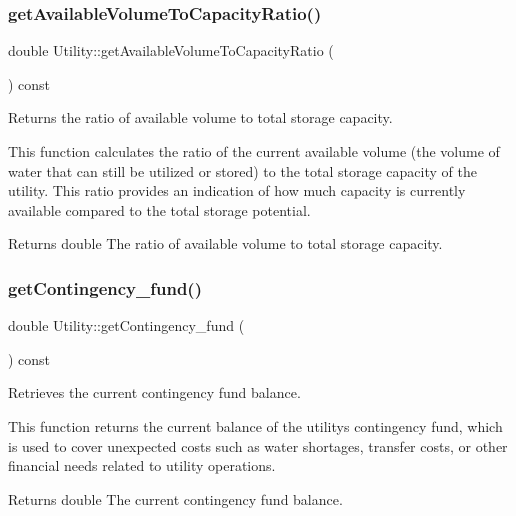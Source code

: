 \subsubsection{\texorpdfstring{get\+Available\+Volume\+To\+Capacity\+Ratio()}{getAvailableVolumeToCapacityRatio()}}
{\footnotesize\ttfamily double Utility\+::get\+Available\+Volume\+To\+Capacity\+Ratio (\begin{DoxyParamCaption}{ }\end{DoxyParamCaption}) const}



Returns the ratio of available volume to total storage capacity. 

This function calculates the ratio of the current available volume (the volume of water that can still be utilized or stored) to the total storage capacity of the utility. This ratio provides an indication of how much capacity is currently available compared to the total storage potential.

\begin{DoxyReturn}{Returns}
double The ratio of available volume to total storage capacity. 
\end{DoxyReturn}
\mbox{\label{classUtility_ab396bc312d5e5ddc0554138060a8a4d3}} 
\subsubsection{\texorpdfstring{get\+Contingency\+\_\+fund()}{getContingency\_fund()}}
{\footnotesize\ttfamily double Utility\+::get\+Contingency\+\_\+fund (\begin{DoxyParamCaption}{ }\end{DoxyParamCaption}) const}



Retrieves the current contingency fund balance. 

This function returns the current balance of the utility\textquotesingle{}s contingency fund, which is used to cover unexpected costs such as water shortages, transfer costs, or other financial needs related to utility operations.

\begin{DoxyReturn}{Returns}
double The current contingency fund balance. 
\end{DoxyReturn}
\mbox{\label{classUtility_af1745fc1364e7a03dc561dd9832b7db4}} 
